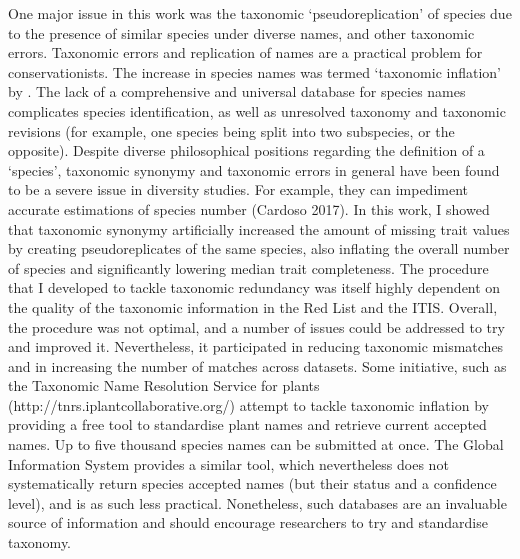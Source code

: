 One major issue in this work was the taxonomic `pseudoreplication' of species due to the presence of similar species under diverse names, and other taxonomic errors. Taxonomic errors and replication of names are a practical problem for conservationists. The increase in species names was termed `taxonomic inflation' by \cite{Isaac2004}.
The lack of a comprehensive and universal database for species names complicates species identification, as well as unresolved taxonomy and taxonomic revisions (for example, one species being split into two subspecies, or the opposite).
Despite diverse philosophical positions regarding the definition of a `species',  taxonomic synonymy and taxonomic errors in general have been found to be a severe issue in diversity studies. For example, they can impediment accurate estimations of species number (Cardoso 2017). In this work, I showed that taxonomic synonymy artificially increased the amount of missing trait values by creating pseudoreplicates of the same species, also inflating the overall number of species and significantly lowering median trait completeness. The procedure that I developed to tackle taxonomic redundancy was itself highly dependent on the quality of the taxonomic information in the Red List and the ITIS. Overall, the procedure was not optimal, and a number of issues could be addressed to try and improved it. Nevertheless, it participated in reducing taxonomic mismatches and in increasing the number of matches across datasets. Some initiative, such as the Taxonomic Name Resolution Service for plants (http://tnrs.iplantcollaborative.org/) attempt to tackle taxonomic inflation by providing a free tool to standardise plant names and retrieve current accepted names. Up to five thousand species names can be submitted at once. The Global Information System provides a similar tool, which nevertheless does not systematically return species accepted names (but their status and a confidence level), and is as such less practical. Nonetheless, such databases are an invaluable source of information and should encourage researchers to try and standardise taxonomy.


